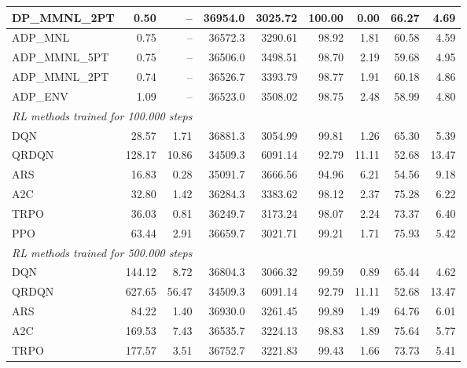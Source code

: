 \begin{samepage}
\begin{center}
\begin{tabular}{l|rr|rr|rr|rr}
    DP\_MMNL\_2PT &     0.50 &    -- &    36954.0 &    3025.72 &  100.00 &    0.00 &   66.27 &    4.69 \\
    \midrule
    ADP\_MNL     &     0.75 &    -- &    36572.3 &    3290.61 &   98.92 &    1.81 &   60.58 &    4.59 \\
    ADP\_MMNL\_5PT &     0.75 &    -- &    36506.0 &    3498.51 &   98.70 &    2.19 &   59.68 &    4.95 \\
    ADP\_MMNL\_2PT &     0.74 &    -- &    36526.7 &    3393.79 &   98.77 &    1.91 &   60.18 &    4.86 \\
    ADP\_ENV     &     1.09 &    -- &    36523.0 &    3508.02 &   98.75 &    2.48 &   58.99 &    4.80 \\
    \midrule
    \multicolumn{9}{l}{\textit{RL methods trained for 100.000 steps}} \\
    \midrule
    DQN          &    28.57 &     1.71 &    36881.3 &    3054.99 &   99.81 &    1.26 &   65.30 &    5.39 \\
    QRDQN        &   128.17 &    10.86 &    34509.3 &    6091.14 &   92.79 &   11.11 &   52.68 &   13.47 \\
    ARS          &    16.83 &     0.28 &    35091.7 &    3666.56 &   94.96 &    6.21 &   54.56 &    9.18 \\
    A2C          &    32.80 &     1.42 &    36284.3 &    3383.62 &   98.12 &    2.37 &   75.28 &    6.22 \\
    TRPO         &    36.03 &     0.81 &    36249.7 &    3173.24 &   98.07 &    2.24 &   73.37 &    6.40 \\
    PPO          &    63.44 &     2.91 &    36659.7 &    3021.71 &   99.21 &    1.71 &   75.93 &    5.42 \\
    \midrule
    \multicolumn{9}{l}{\textit{RL methods trained for 500.000 steps}} \\
    \midrule
    DQN          &   144.12 &     8.72 &    36804.3 &    3066.32 &   99.59 &    0.89 &   65.44 &    4.62 \\
    QRDQN        &   627.65 &    56.47 &    34509.3 &    6091.14 &   92.79 &   11.11 &   52.68 &   13.47 \\
    ARS          &    84.22 &     1.40 &    36930.0 &    3261.45 &   99.89 &    1.49 &   64.76 &    6.01 \\
    A2C          &   169.53 &     7.43 &    36535.7 &    3224.13 &   98.83 &    1.89 &   75.64 &    5.77 \\
    TRPO         &   177.57 &     3.51 &    36752.7 &    3221.83 &   99.43 &    1.66 &   73.73 &    5.41 \\

\end{tabular}
\end{center}
\end{samepage}
